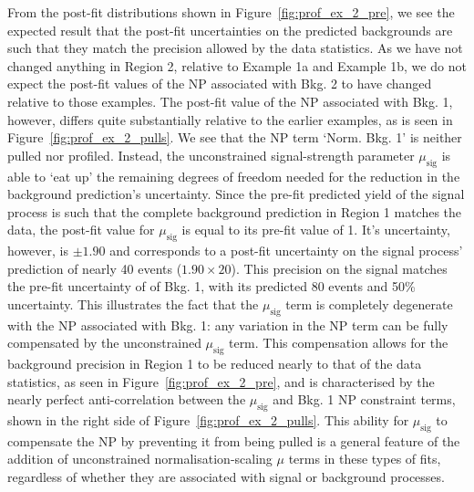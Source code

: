 From the post-fit distributions shown in Figure~\ref{fig:prof_ex_2_pre}, we see the
expected result that the post-fit uncertainties on the predicted backgrounds
are such that they match the precision allowed by the data statistics.
As we have not changed anything in Region 2, relative to Example 1a and Example 1b,
we do not expect the post-fit values of the NP associated with Bkg. 2 to have changed relative
to those examples.
The post-fit value of the NP associated with Bkg. 1, however, differs quite substantially
relative to the earlier examples, as is seen in Figure~\ref{fig:prof_ex_2_pulls}.
We see that the NP term `Norm. Bkg. 1' is neither pulled nor profiled.
Instead, the unconstrained signal-strength parameter $\mu_{\text{sig}}$ is able to `eat up'
the remaining degrees of freedom needed for the reduction in the background prediction's uncertainty.
Since the pre-fit predicted yield of the signal process is such that the complete background
prediction in Region 1 matches the data, the post-fit value for $\mu_{\text{sig}}$ is equal to its
pre-fit value of 1.
It's uncertainty, however, is $\pm 1.90$ and corresponds to a post-fit uncertainty
on the signal process' prediction of nearly 40 events ($1.90 \times 20$).
This precision on the signal matches the pre-fit uncertainty of of Bkg. 1, with its predicted 80 events
and 50\% uncertainty.
This illustrates the fact that the $\mu_{\text{sig}}$ term is completely degenerate with the NP associated with Bkg. 1:
any variation in the NP term can be fully compensated by the unconstrained $\mu_{\text{sig}}$ term.
This compensation allows for the background precision in Region 1 to be reduced nearly to
that of the data statistics, as seen in Figure~\ref{fig:prof_ex_2_pre},
and is characterised by the nearly perfect anti-correlation between the $\mu_{\text{sig}}$ and
Bkg. 1 NP constraint terms, shown in the right side of Figure~\ref{fig:prof_ex_2_pulls}.
This ability for $\mu_{\text{sig}}$ to compensate the NP by preventing it from being pulled is a general
feature of the addition of unconstrained normalisation-scaling $\mu$ terms in these types of fits, regardless
of whether they are associated with signal or background processes.


